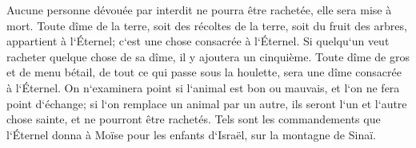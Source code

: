 \verse Aucune personne dévouée par interdit ne pourra être rachetée, elle sera mise à mort. 
\verse Toute dîme de la terre, soit des récoltes de la terre, soit du fruit des arbres, appartient à l`Éternel; c`est une chose consacrée à l`Éternel. 
\verse Si quelqu`un veut racheter quelque chose de sa dîme, il y ajoutera un cinquième. 
\verse Toute dîme de gros et de menu bétail, de tout ce qui passe sous la houlette, sera une dîme consacrée à l`Éternel. 
\verse On n`examinera point si l`animal est bon ou mauvais, et l`on ne fera point d`échange; si l`on remplace un animal par un autre, ils seront l`un et l`autre chose sainte, et ne pourront être rachetés. 
\verse Tels sont les commandements que l`Éternel donna à Moïse pour les enfants d`Israël, sur la montagne de Sinaï. 
